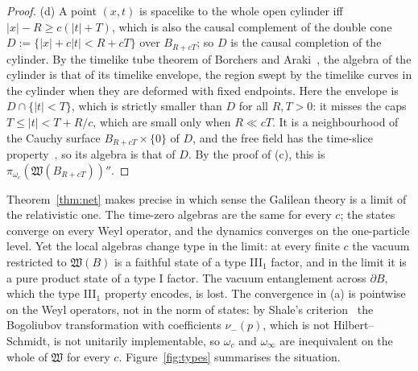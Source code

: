 \documentclass[%
 aip,
 jmp,
 amsmath,amssymb,
 reprint, onecolumn
]{revtex4-1}
\theoremstyle{definition}
\theoremstyle{remark}
\begin{document}
\begin{proof}
(d) A point $(x,t)$ is spacelike to the whole open cylinder iff
$|x|-R\geq c(|t|+T)$, which is also the causal complement of the double
cone $D:=\{|x|+c|t|<R+cT\}$ over $B_{R+cT}$; so $D$ is the causal
completion of the cylinder. By the timelike tube theorem of Borchers and
Araki~\cite{Borchers1961,StrohmaierWitten2023}, the algebra of the
cylinder is that of its timelike envelope, the region swept by the
timelike curves in the cylinder when they are deformed with fixed
endpoints. Here the envelope is $D\cap\{|t|<T\}$, which is strictly
smaller than $D$ for all $R,T>0$: it misses the caps $T\leq|t|<T+R/c$,
which are small only when $R\ll cT$. It is a neighbourhood of the Cauchy
surface $B_{R+cT}\times\{0\}$ of $D$, and the free field has the
time-slice property~\cite{Dimock1980}, so its algebra is that of $D$. By the proof of (c),
this is $\pi_{\omega_c}(\mathfrak W(B_{R+cT}))''$.
\end{proof}

Theorem~\ref{thm:net} makes precise in which sense the Galilean theory
is a limit of the relativistic one. The time-zero algebras are the same
for every $c$; the states converge on every Weyl operator, and the
dynamics converges on the one-particle level. Yet the local algebras
change type in the limit: at every finite $c$ the vacuum restricted to
$\mathfrak W(B)$ is a faithful state of a type III$_1$ factor, and in the
limit it is a pure product state of a type I factor. The vacuum
entanglement across $\partial B$, which the type III$_1$ property
encodes, is lost. The convergence in (a) is pointwise on the Weyl
operators, not in the norm of states: by Shale's
criterion~\cite{Shale1962} the
Bogoliubov transformation with coefficients $\nu_-(p)$, which is not
Hilbert--Schmidt, is not unitarily implementable, so $\omega_c$ and
$\omega_\infty$ are inequivalent on the whole of $\mathfrak W$ for every
$c$. Figure~\ref{fig:types} summarises the situation.
\end{document}
